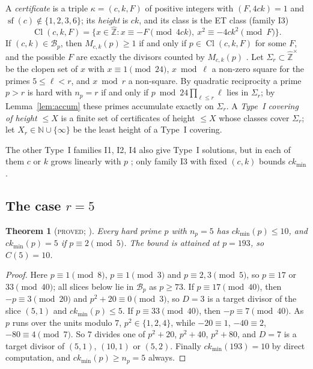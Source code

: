 \documentclass[11pt,reqno]{amsart}
\newtheorem{theorem}{Theorem}[section]
\theoremstyle{definition}
\newcommand{\Z}{\mathbb Z}
\newcommand{\N}{\mathbb N}
\newcommand{\Zh}{\widehat{\Z}}
\newcommand{\Zhu}{\widehat{\Z}^{\times}}
\newcommand{\Cl}{\operatorname{Cl}}
\newcommand{\sqf}{\operatorname{sf}}
\newcommand{\ckmin}{ck_{\min}}
\newcommand{\status}[1]{\textup{\textsc{#1}}}
\begin{document}
A \emph{certificate} is a triple $\kappa=(c,k,F)$ of positive integers
with $(F,4ck)=1$ and $\sqf(c)\notin\{1,2,3,6\}$; its \emph{height} is
$ck$, and its class is the ET class (family I3)
\[
\Cl(c,k,F)=\{x\in\Zh: x\equiv-F\pmod{4ck},\ x^2\equiv-4ck^2\pmod F\}.
\]
If $(c,k)\in\mathcal B_p$, then $M_{c,k}(p)\ge1$ if and only if
$p\in\Cl(c,k,F)$ for some $F$, and the possible $F$ are exactly the
divisors counted by $M_{c,k}(p)$ \cite[Lemma~0.1]{PT2}.  Let
$\Sigma_r\subset\Zhu$ be the clopen set of $x$ with $x\equiv1\pmod{24}$,
$x\bmod\ell$ a non-zero square for the primes $5\le\ell<r$, and $x\bmod r$
a non-square.  By quadratic reciprocity a prime $p>r$ is hard with
$n_p=r$ if and only if $p\bmod 24\prod_{\ell\le r}\ell$ lies in
$\Sigma_r$; by Lemma~\ref{lem:accum} these primes accumulate exactly on
$\Sigma_r$.  A \emph{Type~I covering of height $\le X$} is a finite set of
certificates of height $\le X$ whose classes cover $\Sigma_r$; let
$X_r\in\N\cup\{\infty\}$ be the least height of a Type~I covering.

The other Type~I families I1, I2, I4 also give Type~I solutions, but in
each of them $c$ or $k$ grows linearly with $p$ \cite[\S6.1]{PT1}; only
family I3 with fixed $(c,k)$ bounds $\ckmin$.

\subsection{The case $r=5$}

\begin{theorem}[\status{proved}; {\cite[Thm.~6.1]{PT1}}]\label{thm:C5}
Every hard prime $p$ with $n_p=5$ has $\ckmin(p)\le10$, and
$\ckmin(p)=5$ if $p\equiv2\pmod5$.  The bound is attained at $p=193$, so
$C(5)=10$.
\end{theorem}

\begin{proof}
Here $p\equiv1\pmod 8$, $p\equiv1\pmod3$ and $p\equiv2,3\pmod5$, so
$p\equiv17$ or $33\pmod{40}$; all slices below lie in $\mathcal B_p$ as
$p\ge73$.  If $p\equiv17\pmod{40}$, then $-p\equiv3\pmod{20}$ and
$p^2+20\equiv0\pmod3$, so $D=3$ is a target divisor of the slice $(5,1)$
and $\ckmin(p)\le5$.  If $p\equiv33\pmod{40}$, then $-p\equiv7\pmod{40}$.
As $p$ runs over the units modulo $7$, $p^2\in\{1,2,4\}$, while
$-20\equiv1$, $-40\equiv2$, $-80\equiv4\pmod 7$.  So $7$ divides one of
$p^2+20$, $p^2+40$, $p^2+80$, and $D=7$ is a target divisor of $(5,1)$,
$(10,1)$ or $(5,2)$.  Finally $\ckmin(193)=10$ by direct computation,
and $\ckmin(p)\ge n_p=5$ always.
\end{proof}
\end{document}
